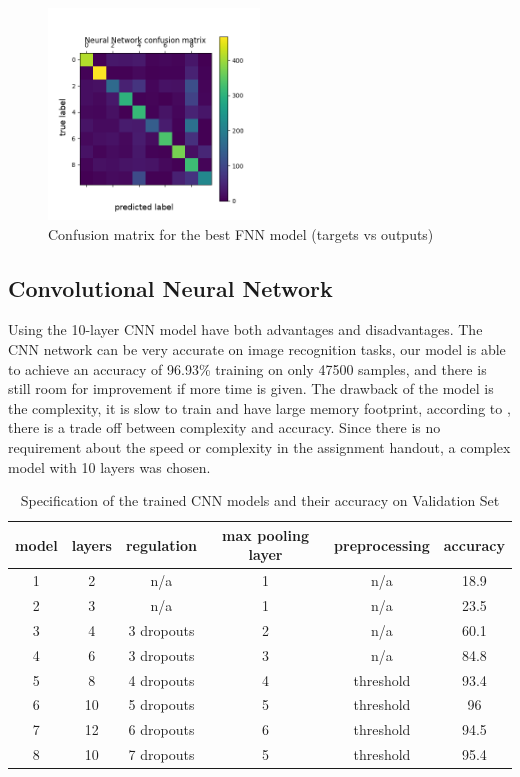 \documentclass[letterpaper, 10 pt, conference]{ieeeconf}  %
\begin{document}
\begin{figure}[h]
	\begin{center}
			\includegraphics[width=0.5\textwidth]{figures/fnn_conf.png}  %
		\caption{Confusion matrix for the best FNN model (targets vs outputs)}
		\label{fig:fnnconf}
	\end{center}
\end{figure}


\subsection{Convolutional Neural Network}
Using the 10-layer CNN model have both advantages and disadvantages. The CNN network can be very accurate on image recognition tasks, our model is able to achieve an accuracy of 96.93\% training on only 47500 samples, and there is still room for improvement if more time is given. The drawback of the model is the complexity, it is slow to train and have large memory footprint, according to \cite{dhingra2017model}, there is a trade off between complexity and accuracy. Since there is no requirement about the speed or complexity in the assignment handout, a complex model with 10 layers was chosen. 

\begin{table}
	\centering
	\caption{Specification of the trained CNN models and their accuracy on Validation Set}
	\label{tab:CNNmodels}
	\begin{tabular}{|c|c|c|c|c|c|}
		\hline
		model	&layers&	regulation&	max pooling layer&preprocessing&accuracy\\\hline
		1&	2& n/a & 1   &	n/a		&18.9\\\hline	
		2&	3&	n/a		&1  &	n/a		&23.5\\\hline
		3&	4&	3 dropouts&2&	n/a		&60.1\\\hline
		4&	6&	3 dropouts&3&	n/a		& 84.8	\\\hline
		5&	8&	4 dropouts&4&threshold&93.4	\\\hline
		6&	10&	5 dropouts&5&threshold &96\\\hline
		7&	12&	6 dropouts&6&threshold&94.5\\\hline	
		8&	10&	7 dropouts&5&threshold&95.4\\\hline			
	\end{tabular}
\end{table}
\end{document}
